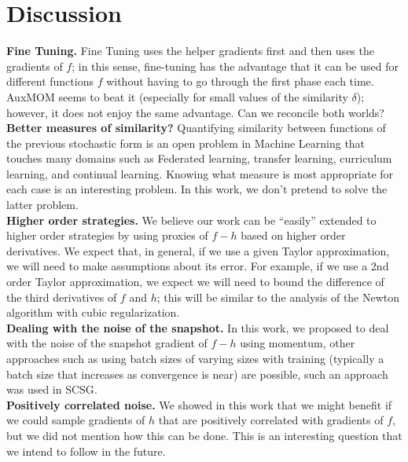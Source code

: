 \documentclass[10pt]{article} %
\theoremstyle{plain}
\theoremstyle{definition}
\theoremstyle{remark}
\begin{document}
\section{Discussion}\label{section6}

\textbf{Fine Tuning.} Fine Tuning uses the helper gradients first and then uses the gradients of $f$; in this sense, fine-tuning has the advantage that it can be used for different functions $f$ without having to go through the first phase each time. AuxMOM seems to beat it (especially for small values of the similarity $\delta$); however, it does not enjoy the same advantage. Can we reconcile both worlds?\\ 
\textbf{Better measures of similarity?} Quantifying similarity between functions of the previous stochastic form is an open problem in Machine Learning that touches many domains such as Federated learning, transfer learning, curriculum learning, and continual learning. Knowing what measure is most appropriate for each case is an interesting problem. In this work, we don't pretend to solve the latter problem. \\
\textbf{Higher order strategies.} We believe our work can be ``easily'' extended to higher order strategies by using proxies of $f-h$ based on higher order derivatives. We expect that, in general, if we use a given Taylor approximation, we will need to make assumptions about its error. For example, if we use a 2nd order Taylor approximation, we expect we will need to bound the difference of the third derivatives of $f$ and $h$; this will be similar to the analysis of the Newton algorithm with cubic regularization\citep{NewtonCubicReg}.\\
\textbf{Dealing with the noise of the snapshot.} In this work, we proposed to deal with the noise of the snapshot gradient of $f-h$ using momentum, other approaches such as using batch sizes of varying sizes with training (typically a batch size that increases as convergence is near) are possible, such an approach was used in SCSG\citep{SCSG}.\\
\textbf{Positively correlated noise.} We showed in this work that we might benefit if we could sample gradients of $h$ that are positively correlated with gradients of $f$, but we did not mention how this can be done. This is an interesting question that we intend to follow in the future.
\end{document}
